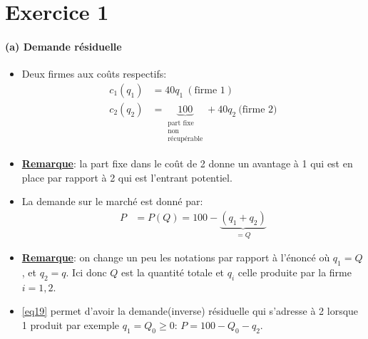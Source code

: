 \section{Exercice 1}
\frame{\sectionpage}
\begin{frame}[allowframebreaks]{\insertsection}
\framesubtitle{(a) Demande résiduelle}
\begin{itemize}
    \item Deux firmes aux coûts respectifs: 
    \begin{align}
     c_1(q_1) &= 40q_1 \ (\text{firme 1}) \\
     c_2(q_2) &= 
     \underbrace{100}_{\substack{\text{part fixe}\\\text{non} \\ \text{récupérable}}} + 40q_2 \ \text{(firme 2)}
     \label{eq18}
    \end{align}
    \item \textbf{\underline{Remarque}}: la part fixe dans le coût de 2 donne un avantage 
    à 1 qui est en place par rapport à 2 qui est l'entrant potentiel.
    \item La demande sur le marché est donné par: 
    \begin{align}
        P&= P(Q) = 100 - \underbrace{(q_1 + q_2)}_{= Q}
        \label{eq19}
    \end{align}
    \item \textbf{\underline{Remarque}}: on change un peu les notations par rapport à l'énoncé où $q_1=Q$, et $q_2 = q$. Ici donc  
    $Q$ est la quantité totale et $q_i$ celle produite par la firme $i=1, 2$.
    \item \eqref{eq19} permet d'avoir la demande(inverse) résiduelle qui s'adresse à 2 lorsque 1 produit par exemple $q_1=Q_0\geq 0$: $P=100-Q_0-q_2$.
\end{itemize}
\end{frame}

